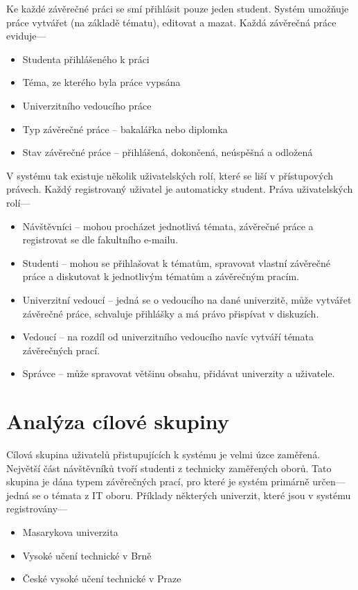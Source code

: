 Ke každé závěrečné práci se smí přihlásit pouze jeden student. Systém umožňuje práce vytvářet (na základě tématu), editovat a mazat. Každá závěrečná práce eviduje---

\begin{itemize}
    \item Studenta přihlášeného k práci
    \item Téma, ze kterého byla práce vypsána
    \item Univerzitního vedoucího práce
    \item Typ závěrečné práce -- bakalářka nebo diplomka
    \item Stav závěrečné práce -- přihlášená, dokončená, neúspěšná a odložená
\end{itemize}

V systému tak existuje několik uživatelských rolí, které se liší v přístupových právech. Každý registrovaný uživatel je automaticky student. Práva uživatelských rolí---

\begin{itemize}
    \item Návštěvníci -- mohou procházet jednotlivá témata, závěrečné práce a registrovat se dle fakultního e-mailu.
    \item Studenti -- mohou se přihlašovat k tématům, spravovat vlastní závěrečné práce a diskutovat k jednotlivým tématům a závěrečným pracím.
    \item Univerzitní vedoucí -- jedná se o vedoucího na dané univerzitě, může vytvářet závěrečné práce, schvaluje přihlášky a má právo přispívat v diskuzích.
    \item Vedoucí -- na rozdíl od univerzitního vedoucího navíc vytváří témata závěrečných prací.
    \item Správce -- může spravovat většinu obsahu, přidávat univerzity a uživatele.
\end{itemize}

\section{Analýza cílové skupiny}

Cílová skupina uživatelů přistupujících k systému je velmi úzce zaměřená. Největší část návštěvníků tvoří studenti z technicky zaměřených oborů. Tato skupina je dána typem závěrečných prací, pro které je systém primárně určen---jedná se o témata z IT oboru. Příklady některých univerzit, které jsou v systému registrovány---

\begin{itemize}
    \item Masarykova univerzita
    \item Vysoké učení technické v Brně
    \item České vysoké učení technické v Praze
\end{itemize}

